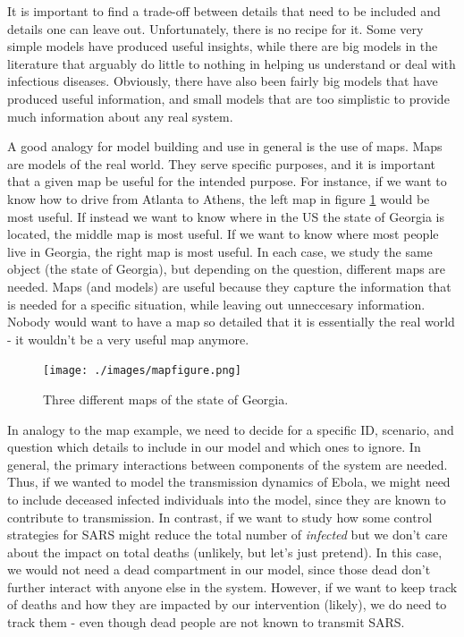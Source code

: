 \documentclass[]{book}
\theoremstyle{definition}
\theoremstyle{definition}
\theoremstyle{definition}
\theoremstyle{remark}
\begin{document}
It is important to find a trade-off between details that need to be
included and details one can leave out. Unfortunately, there is no
recipe for it. Some very simple models have produced useful insights,
while there are big models in the literature that arguably do little to
nothing in helping us understand or deal with infectious diseases.
Obviously, there have also been fairly big models that have produced
useful information, and small models that are too simplistic to provide
much information about any real system.

A good analogy for model building and use in general is the use of maps.
Maps are models of the real world. They serve specific purposes, and it
is important that a given map be useful for the intended purpose. For
instance, if we want to know how to drive from Atlanta to Athens, the
left map in figure \ref{fig:mapfigure} would be most useful. If instead
we want to know where in the US the state of Georgia is located, the
middle map is most useful. If we want to know where most people live in
Georgia, the right map is most useful. In each case, we study the same
object (the state of Georgia), but depending on the question, different
maps are needed. Maps (and models) are useful because they capture the
information that is needed for a specific situation, while leaving out
unneccesary information. Nobody would want to have a map so detailed
that it is essentially the real world - it wouldn't be a very useful map
anymore.

\begin{figure}
\centering
\texttt{[image: ./images/mapfigure.png]}
\caption{\label{fig:mapfigure}Three different maps of the state of Georgia.}
\end{figure}

In analogy to the map example, we need to decide for a specific ID,
scenario, and question which details to include in our model and which
ones to ignore. In general, the primary interactions between components
of the system are needed. Thus, if we wanted to model the transmission
dynamics of Ebola, we might need to include deceased infected
individuals into the model, since they are known to contribute to
transmission. In contrast, if we want to study how some control
strategies for SARS might reduce the total number of \emph{infected} but
we don't care about the impact on total deaths (unlikely, but let's just
pretend). In this case, we would not need a dead compartment in our
model, since those dead don't further interact with anyone else in the
system. However, if we want to keep track of deaths and how they are
impacted by our intervention (likely), we do need to track them - even
though dead people are not known to transmit SARS.
\end{document}
